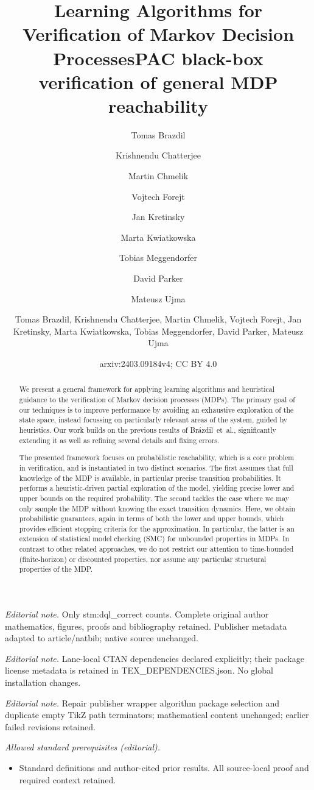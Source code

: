 \documentclass{article}
\title{Learning Algorithms for Verification of Markov Decision Processes}
\author{Tomas Brazdil \and Krishnendu Chatterjee \and Martin Chmelik \and Vojtech Forejt \and Jan Kretinsky \and Marta Kwiatkowska \and Tobias Meggendorfer \and David Parker \and Mateusz Ujma}\date{}
\title{PAC black-box verification of general MDP reachability}
\author{Tomas Brazdil, Krishnendu Chatterjee, Martin Chmelik, Vojtech Forejt, Jan Kretinsky, Marta Kwiatkowska, Tobias Meggendorfer, David Parker, Mateusz Ujma}
\date{arxiv:2403.09184v4; CC BY 4.0}
\begin{document}
\maketitle
\noindent\textit{Editorial note.} Only stm:dql\_correct counts. Complete original author mathematics, figures, proofs and bibliography retained. Publisher metadata adapted to article/natbib; native source unchanged.\par\medskip
\noindent\textit{Editorial note.} Lane-local CTAN dependencies declared explicitly; their package license metadata is retained in TEX\_DEPENDENCIES.json. No global installation changes.\par\medskip
\noindent\textit{Editorial note.} Repair publisher wrapper algorithm package selection and duplicate empty TikZ path terminators; mathematical content unchanged; earlier failed revisions retained.\par\medskip
\noindent\textit{Allowed standard prerequisites (editorial).}\begin{itemize}
\item Standard definitions and author-cited prior results. All source-local proof and required context retained.
\end{itemize}\medskip
	\maketitle
	
	\begin{abstract}
		We present a general framework for applying learning algorithms and heuristical guidance to the verification of Markov decision processes (MDPs).
The primary goal of our techniques is to improve performance by avoiding an exhaustive exploration of the state space, instead focussing on particularly relevant areas of the system, guided by heuristics.
Our work builds on the previous results of Br{\'{a}}zdil~et~al., significantly extending it as well as refining several details and fixing errors.

The presented framework focuses on probabilistic reachability, which is a core problem in verification, and is instantiated in two distinct scenarios.
The first assumes that full knowledge of the MDP is available, in particular precise transition probabilities.
It performs a heuristic-driven partial exploration of the model, yielding precise lower and upper bounds on the required probability.
The second tackles the case where we may only sample the MDP without knowing the exact transition dynamics.
Here, we obtain probabilistic guarantees, again in terms of both the lower and upper bounds, which provides efficient stopping criteria for the approximation.
In particular, the latter is an extension of statistical model checking (SMC) for unbounded properties in MDPs.
In contrast to other related approaches, we do not restrict our attention to time-bounded (finite-horizon) or discounted properties, nor assume any particular structural properties of the MDP.
	\end{abstract}
\end{document}
